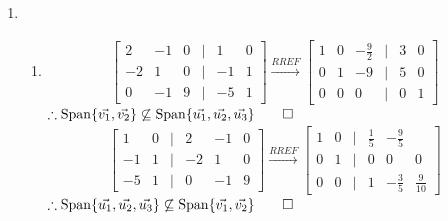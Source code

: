 \documentclass[12pt, a4paper]{article}
\begin{document}
\begin{enumerate}[Q\arabic*.]
  \item
    \begin{enumerate}[(\alph*)]
      \item 
        \begin{align*}
          \begin{bmatrix}
            2&-1&0&|&1&0\\
            -2&1&0&|&-1&1\\
            0&-1&9&|&-5&1
          \end{bmatrix}\xrightarrow{RREF}
          \begin{bmatrix}
            1&0&-\frac{9}{2}&|&3&0\\
            0&1&-9&|&5&0\\
            0&0&0&|&0&1
          \end{bmatrix}
        \end{align*}
        $\therefore \operatorname{Span}\{\vec{v_1}, \vec{v_2}\} \not\subseteq \operatorname{Span}\{\vec{u_1}, \vec{u_2}, \vec{u_3}\} \qed$
        \begin{align*}
          \begin{bmatrix}
            1&0&|&2&-1&0\\
            -1&1&|&-2&1&0\\
            -5&1&|&0&-1&9
          \end{bmatrix}\xrightarrow{RREF}
          \begin{bmatrix}
            1&0&|&\frac{1}{5}&-\frac{9}{5}\\
            0&1&|&0&0&0\\
            0&0&|&1&-\frac{3}{5}&\frac{9}{10}
          \end{bmatrix}
        \end{align*}
        $\therefore \operatorname{Span}\{\vec{u_1}, \vec{u_2}, \vec{u_3}\} \not\subseteq \operatorname{Span}\{\vec{v_1}, \vec{v_2}\} \qed$
      

\end{enumerate}
\end{enumerate}
\end{document}
